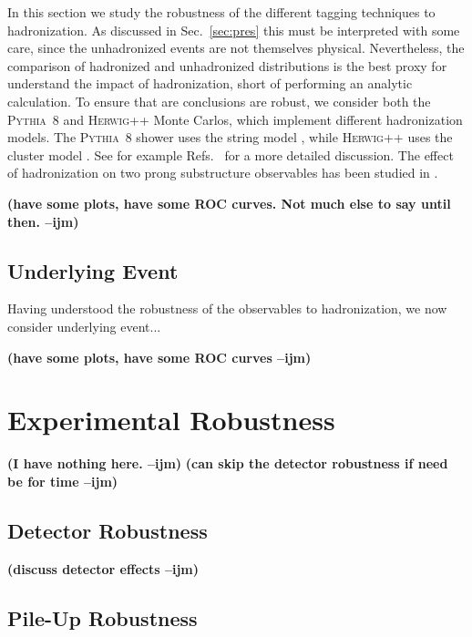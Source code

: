 \documentclass[11pt,letterpaper]{article}
\newcommand{\pythia}{\textsc{Pythia~8}\xspace}
\newcommand{\herwig}{\textsc{Herwig++}\xspace}
\DeclareRobustCommand{\Sec}[1]{Sec.~\ref{#1}}
\DeclareRobustCommand{\Refs}[1]{Refs.~\cite{#1}}
\newcommand{\ijm}[1]{\textbf{\textcolor{llblue}{(#1 --ijm)}}}
\begin{document}
In this section we study the robustness of the different tagging techniques to hadronization. As discussed in \Sec{sec:pres} this must be interpreted with some care, since the unhadronized events are not themselves physical. Nevertheless, the comparison of hadronized and unhadronized distributions is the best proxy for understand the impact of hadronization, short of performing an analytic calculation. To ensure that are conclusions are robust, we consider both the \pythia and \herwig Monte Carlos, which implement different hadronization models. The \pythia shower uses the string model \cite{Andersson:1983ia,Andersson:1998tv}, while \herwig uses the cluster model \cite{Webber:1983if,Marchesini:1987cf}. See for example \Refs{Buckley:2011ms,Skands:2011pf,Skands:2012ts} for a more detailed discussion. The effect of hadronization on two prong substructure observables has been studied in \cite{Larkoski:2015kga,Salam:2016yht}.


\ijm{have some plots, have some ROC curves. Not much else to say until then.}

\subsection{Underlying Event}\label{sec:UE}

Having understood the robustness of the observables to hadronization, we now consider underlying event...

\ijm{have some plots, have some ROC curves}

\section{Experimental Robustness}\label{sec:exp}


\ijm{I have nothing here.}   \ijm{can skip the detector robustness if need be for time}

\subsection{Detector Robustness}\label{sec:detector_robust}

\ijm{discuss detector effects}

\subsection{Pile-Up Robustness}\label{sec:pu_robust}
\end{document}
